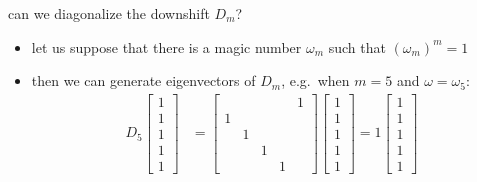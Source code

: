 \documentclass[10pt,
               svgnames,
               hyperref={colorlinks,citecolor=DeepPink4,linkcolor=FireBrick,urlcolor=Maroon},
               usepdftitle=false]{beamer}
\begin{document}
\begin{frame}{can we diagonalize the downshift $D_m$?}

\begin{itemize}
\item let us suppose that there is a magic number $\omega_m$ such that $(\omega_m)^m = 1$
\item then we can generate eigenvectors of $D_m$, e.g.~when $m=5$ and $\omega=\omega_5$:
{\footnotesize
\begin{align*}
D_5 \begin{bmatrix} 1 \\ 1 \\ 1 \\ 1 \\ 1 \end{bmatrix} &= \begin{bmatrix} & & & & 1 \\ 1 & & & & \\ & 1 & & & \\ & & 1 & & \\ & & & 1 & \end{bmatrix} \begin{bmatrix} 1 \\ 1 \\ 1 \\ 1 \\ 1 \end{bmatrix} = 1 \begin{bmatrix} 1 \\ 1 \\ 1 \\ 1 \\ 1 \end{bmatrix}  \\

\end{align*}}
\end{itemize}
\end{frame}
\end{document}
